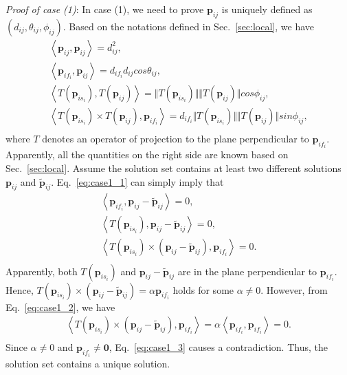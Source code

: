 \documentclass{article}
\begin{document}
\emph{Proof of case (1)}:
In case (1), we need to prove $\textbf{p}_{ij}$ is uniquely defined as $(d_{ij}, \theta_{ij}, \phi_{ij})$.
Based on the notations defined in Sec.~\ref{sec:local}, we have
\begin{equation}
\begin{aligned}
    \left<\textbf{p}_{ij}, \textbf{p}_{ij} \right> = d^2_{ij}, \\
    \left<\textbf{p}_{if_i}, \textbf{p}_{ij} \right> = d_{if_i}d_{ij}cos\theta_{ij}, \\
    \left<T(\textbf{p}_{is_i}), T(\textbf{p}_{ij}) \right> = \Vert T(\textbf{p}_{is_i})\Vert \Vert T(\textbf{p}_{ij})\Vert cos\phi_{ij}, \\
    \left<T(\textbf{p}_{is_i})\times T(\textbf{p}_{ij}),  \textbf{p}_{if_i} \right> =d_{if_i} \Vert T(\textbf{p}_{is_i})\Vert \Vert T(\textbf{p}_{ij})\Vert sin\phi_{ij}, \\
    \label{eq:case1_1}
\end{aligned}
\end{equation}
where $T$ denotes an operator of projection to 
the plane perpendicular to $\textbf{p}_{if_i}$.
Apparently, all the quantities on the right side are known based on 
Sec.~\ref{sec:local}. 
Assume the solution set
contains at least two different solutions $\textbf{p}_{ij}$
and $\widetilde{\textbf{p}}_{ij}$.
Eq.~\ref{eq:case1_1} can simply imply that
\begin{equation}
\begin{aligned}
    \left<\textbf{p}_{if_i}, \textbf{p}_{ij}- \widetilde{\textbf{p}}_{ij} \right> = 0, \\
    \left<T(\textbf{p}_{is_i}), \textbf{p}_{ij}- \widetilde{\textbf{p}}_{ij} \right> = 0, \\
    \left<T(\textbf{p}_{is_i}) \times (\textbf{p}_{ij}- \widetilde{\textbf{p}}_{ij}), \textbf{p}_{if_i}\right> = 0. \\
\label{eq:case1_2}
\end{aligned}
\end{equation}
Apparently, both $T(\textbf{p}_{is_i})$ and 
$\textbf{p}_{ij}- \widetilde{\textbf{p}}_{ij}$
are in the plane perpendicular to $\textbf{p}_{if_i}$.
Hence, $T(\textbf{p}_{is_i}) \times (\textbf{p}_{ij}- \widetilde{\textbf{p}}_{ij}) = \alpha \textbf{p}_{if_i}$
holds for some $\alpha\neq0$.
However, from Eq.~\ref{eq:case1_2}, we have
\begin{equation}
\begin{aligned}
    \left<T(\textbf{p}_{is_i}) \times (\textbf{p}_{ij}- \widetilde{\textbf{p}}_{ij}), \textbf{p}_{if_i}\right>  = \alpha\left<\textbf{p}_{if_i}, \textbf{p}_{if_i} \right> = 0. \\
\label{eq:case1_3}
\end{aligned}
\end{equation}
Since $\alpha\neq0$ and $\textbf{p}_{if_i}\neq\textbf{0}$, Eq.~\ref{eq:case1_3} causes a contradiction. Thus, the solution set contains a unique solution.
\end{document}

